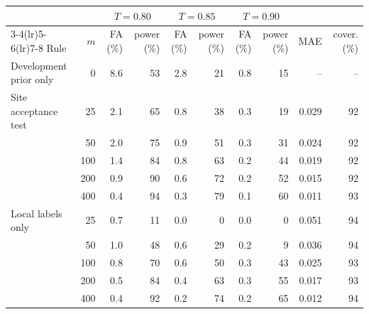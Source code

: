 \begin{tabular*}{\tblwidth}{@{\extracolsep{\fill}}lrrrrrrrrr@{}}
\toprule
 & & \multicolumn{2}{c}{$T=0.80$} & \multicolumn{2}{c}{$T=0.85$} & \multicolumn{2}{c}{$T=0.90$} & & \\
\cmidrule(lr){3-4}\cmidrule(lr){5-6}\cmidrule(lr){7-8}
Rule & $m$ & FA (\%) & power (\%) & FA (\%) & power (\%) & FA (\%) & power (\%) & MAE & cover. (\%) \\
\midrule
Development prior only & 0 & 8.6 & 53 & 2.8 & 21 & 0.8 & 15 & -- & -- \\
\addlinespace[2pt]
Site acceptance test & 25 & 2.1 & 65 & 0.8 & 38 & 0.3 & 19 & 0.029 & 92 \\
 & 50 & 2.0 & 75 & 0.9 & 51 & 0.3 & 31 & 0.024 & 92 \\
 & 100 & 1.4 & 84 & 0.8 & 63 & 0.2 & 44 & 0.019 & 92 \\
 & 200 & 0.9 & 90 & 0.6 & 72 & 0.2 & 52 & 0.015 & 92 \\
 & 400 & 0.4 & 94 & 0.3 & 79 & 0.1 & 60 & 0.011 & 93 \\
\addlinespace[2pt]
Local labels only & 25 & 0.7 & 11 & 0.0 & 0 & 0.0 & 0 & 0.051 & 94 \\
 & 50 & 1.0 & 48 & 0.6 & 29 & 0.2 & 9 & 0.036 & 94 \\
 & 100 & 0.8 & 70 & 0.6 & 50 & 0.3 & 43 & 0.025 & 93 \\
 & 200 & 0.5 & 84 & 0.4 & 63 & 0.3 & 55 & 0.017 & 93 \\
 & 400 & 0.4 & 92 & 0.2 & 74 & 0.2 & 65 & 0.012 & 94 \\
\bottomrule
\end{tabular*}
